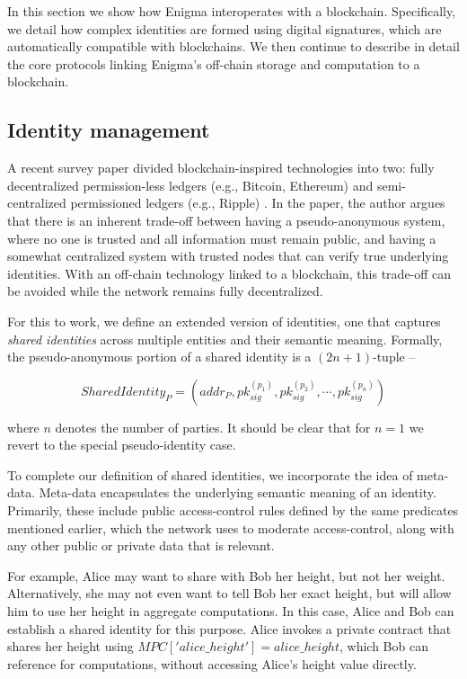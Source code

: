 \documentclass{article} \usepackage{nips13submit_e,times}
\begin{document}
In this section we show how Enigma interoperates with a blockchain. Specifically, we detail how complex identities are formed using digital signatures, which are automatically compatible with blockchains. We then continue to describe in detail the core protocols linking Enigma's off-chain storage and computation to a blockchain.



\subsection{Identity management}
\label{sec:identities}

A recent survey paper divided blockchain-inspired technologies into two: fully decentralized permission-less ledgers (e.g., Bitcoin, Ethereum) and semi-centralized permissioned ledgers (e.g., Ripple) \cite{consensusaas}. In the paper, the author argues that there is an inherent trade-off between having a pseudo-anonymous system, where no one is trusted and all information must remain public, and having a somewhat centralized system with trusted nodes that can verify true underlying identities. With an off-chain technology linked to a blockchain, this trade-off can be avoided while the network remains fully decentralized.

For this to work, we define an extended version of identities, one that captures \textit{shared identities} across multiple entities and their semantic meaning. Formally, the pseudo-anonymous portion of a shared identity is a $(2n+1)$-tuple -- 

\begin{equation}
	SharedIdentity_{P} = (addr_P, pk^{(p_1)}_{sig}, pk^{(p_2)}_{sig}, \cdots, pk^{(p_n)}_{sig})
\end{equation}

where $n$ denotes the number of parties. It should be clear that for $n=1$ we revert to the special pseudo-identity case.

To complete our definition of shared identities, we incorporate the idea of meta-data. Meta-data encapsulates the underlying semantic meaning of an identity. Primarily, these include public access-control rules defined by the same predicates mentioned earlier, which the network uses to moderate access-control, along with any other public or private data that is relevant.

For example, Alice may want to share with Bob her height, but not her weight. Alternatively, she may not even want to tell Bob her exact height, but will allow him to use her height in aggregate computations. In this case, Alice and Bob can establish a shared identity for this purpose. Alice invokes a private contract that shares her height using $MPC['alice\_height'] = alice\_height$, which Bob can reference for computations, without accessing Alice's height value directly. 
\end{document}
